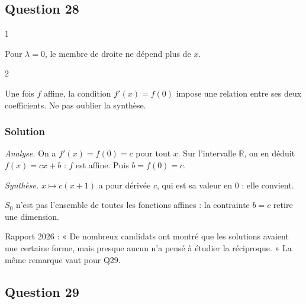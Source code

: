 \documentclass[11pt,a4paper]{article}
\newcommand{\equationajustee}[1]{%
  \sbox{\boiteequation}{$\displaystyle #1$}%
  \ifdim\wd\boiteequation>\linewidth
    \[\resizebox{\linewidth}{!}{\usebox{\boiteequation}}\]%
  \else
    \[#1\]%
  \fi}
\begin{document}
\hypertarget{question-28}{%
\subsection{Question 28}\label{question-28}}

\begin{indication}{1}

Pour \(\lambda=0\), le membre de droite ne dépend plus de \(x\).

\end{indication}

\begin{indication}{2}

Une fois \(f\) affine, la condition \(f'(x)=f(0)\) impose une relation entre ses deux coefficients. Ne pas oublier la synthèse.

\end{indication}

\hypertarget{solution-27}{%
\subsubsection{Solution}\label{solution-27}}

\emph{Analyse.} On a \(f'(x)=f(0)=c\) pour tout \(x\). Sur l'intervalle \(\mathbb R\), on en déduit \(f(x)=cx+b\) : \(f\) est affine. Puis \(b=f(0)=c\).

\emph{Synthèse.} \(x\mapsto c(x+1)\) a pour dérivée \(c\), qui est sa valeur en \(0\) : elle convient.
\equationajustee{\boxed{S_0=\mathrm{Vect}(x\mapsto x+1).}}

\begin{piege}

\(S_0\) n'est pas l'ensemble de toutes les fonctions affines : la contrainte \(b=c\) retire une dimension.

\end{piege}

\begin{jury}

Rapport 2026 : « De nombreux candidats ont montré que les solutions avaient une certaine forme, mais presque aucun n'a pensé à étudier la réciproque. » La même remarque vaut pour Q29.

\end{jury}

\hypertarget{question-29}{%
\subsection{Question 29}\label{question-29}}
\end{document}

